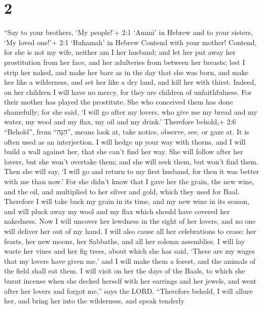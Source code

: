 \hypertarget{section-1}{%
\section{2}\label{section-1}}

 ``Say to your brothers, `My people!'+ 2:1 `Ammi' in Hebrew
and to your sisters, `My loved one!'+ 2:1 `Ruhamah' in Hebrew
 Contend with your mother! Contend, for she is not my wife,
neither am I her husband; and let her put away her prostitution from her
face, and her adulteries from between her breasts;  lest I
strip her naked, and make her bare as in the day that she was born, and
make her like a wilderness, and set her like a dry land, and kill her
with thirst.  Indeed, on her children I will have no mercy,
for they are children of unfaithfulness.  For their mother
has played the prostitute. She who conceived them has done shamefully;
for she said, `I will go after my lovers, who give me my bread and my
water, my wool and my flax, my oil and my drink.'  Therefore
behold,+ 2:6 ``Behold'', from ``הִנֵּה'', means look at, take notice,
observe, see, or gaze at. It is often used as an interjection. I will
hedge up your way with thorns, and I will build a wall against her, that
she can't find her way.  She will follow after her lovers,
but she won't overtake them; and she will seek them, but won't find
them. Then she will say, `I will go and return to my first husband, for
then it was better with me than now.'  For she didn't know
that I gave her the grain, the new wine, and the oil, and multiplied to
her silver and gold, which they used for Baal.  Therefore I
will take back my grain in its time, and my new wine in its season, and
will pluck away my wool and my flax which should have covered her
nakedness.  Now I will uncover her lewdness in the sight of
her lovers, and no one will deliver her out of my hand.  I
will also cause all her celebrations to cease: her feasts, her new
moons, her Sabbaths, and all her solemn assemblies.  I will
lay waste her vines and her fig trees, about which she has said, `These
are my wages that my lovers have given me,' and I will make them a
forest, and the animals of the field shall eat them.  I
will visit on her the days of the Baals, to which she burnt incense when
she decked herself with her earrings and her jewels, and went after her
lovers and forgot me,'' says the LORD.  ``Therefore behold,
I will allure her, and bring her into the wilderness, and speak tenderly
